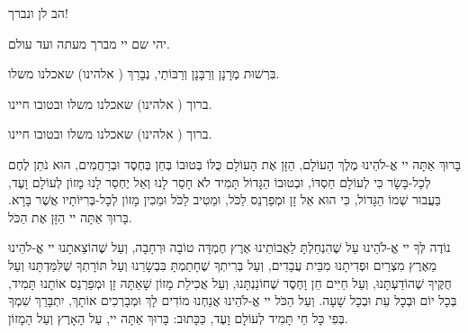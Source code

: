 

\break

\begin{center}

הב לן ונברך!


יהי שם יי מברך מעתה ועד עולם.


בִּרְשׁוּת מְרָנָן וְרַבָּנָן וְרַבּוֹתַי, נְבָרֵךְ ( אלהינו) שאכלנו משלו.


ברוך ( אלהינו) שאכלנו משלו ובטובו חיינו.


ברוך ( אלהינו) שאכלנו משלו ובטובו חיינו.
\end{center}

בָּרוּךְ אַתָּה יי אֱ-לֹהֵינוּ מֶלֶךְ הָעוֹלָם, הַזָּן אֶת הָעוֹלָם כֻּלּוֹ בְּטוּבוֹ בְּחֵן בְּחֶסֶד וּבְרַחֲמִים, הוּא נֹתֵן לֶחֶם לְכָל-בָּשָׂר כִּי לְעוֹלָם חַסְדּוֹ, וּבְטוּבוֹ הַגָּדוֹל תָּמִיד לֹא חָסַר לָנוּ וְאַל יֶחְסַר לָנוּ מָזוֹן לְעוֹלָם וָעֶד, בַּעֲבוּר שְׁמוֹ הַגָּדוֹל, כִּי הוּא אֵל זָן וּמְפַרְנֵס לַכֹּל, וּמֵטִיב לַכֹּל וּמֵכִין מָזוֹן לְכָל-בְּרִיּוֹתָיו אֲשֶׁר בָּרָא. בָּרוּךְ אַתָּה יי הַזָּן אֶת הַכֹּל.

נוֹדֶה לְּךָ יי אֱ-לֹהֵינוּ עַל שֶׁהִנְחַלְתָּ לַאֲבוֹתֵינוּ אֶרֶץ חֶמְדָּה טוֹבָה וּרְחָבָה, וְעַל שֶׁהוֹצֵאתָנוּ יי אֱ-לֹהֵינוּ מֵאֶרֶץ מִצְרַיִם וּפְדִיתָנוּ מִבֵּית עֲבָדִים, וְעַל בְּרִיתְךָ שֶׁחָתַמְתָּ בִּבְשָׂרֵנוּ וְעַל תּוֹרָתְךָ שֶׁלִּמַּדְתָּנוּ וְעַל חֻקֶּיךָ שֶׁהוֹדַעְתָּנוּ, וְעַל חַיִּים חֵן וָחֶסֶד שֶׁחוֹנַנְתָּנוּ, וְעַל אֲכִילַת מָזוֹן שָׁאַתָּה זָן וּמְפַרְנֵס אוֹתָנוּ תָּמִיד, בְּכָל יוֹם וּבְכָל עֵת וּבְכָל שָׁעָה. וְעַל הַכֹּל יי אֱ-לֹהֵינוּ אֲנַחְנוּ מוֹדִים לָךְ וּמְבָרְכִים אוֹתָךְ, יִתְבָּרַךְ שִׁמְךָ בְּפִי כָּל חַי תָּמִיד לְעוֹלָם וָעֶד, כַּכָּתוּב: 
בָּרוּךְ אַתָּה יי, עַל הָאָרֶץ וְעַל הַמָזוֹן.

